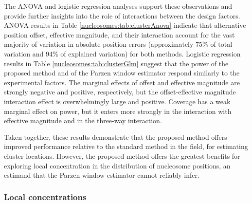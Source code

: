 The ANOVA and logistic regression analyses support these observations and provide further insights into the role of interactions between the design factors.
ANOVA results in Table \ref{nucleosomes:tab:clusterAnova} indicate that alternative position offset, effective magnitude, and their interaction account for the vast majority of variation in absolute position errors (approximately 75\% of total variation and 94\% of explained variation) for both methods.
Logistic regression results in Table \ref{nucleosomes:tab:clusterGlm} suggest that the power of the proposed method and of the Parzen window estimator respond similarly to the experimental factors.
The marginal effects of offset and effective magnitude are strongly negative and positive, respectively, but the offset-effective magnitude interaction effect is overwhelmingly large and positive.
Coverage has a weak marginal effect on power, but it enters more strongly in the interaction with effective magnitude and in the three-way interaction.

Taken together, these results demonstrate that the proposed method offers improved performance relative to the standard method in the field, for estimating cluster locations.
However, the proposed method offers the greatest benefits for exploring  local concentration in the distribution of nucleosome positions, an estimand that the Parzen-window estimator cannot reliably infer.

\subsubsection{Local concentrations}
\label{nucleosomes:sec:localPower}

